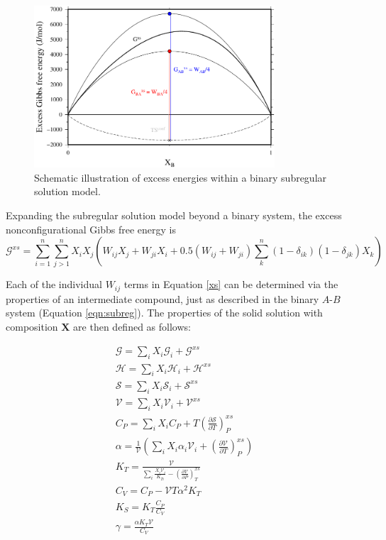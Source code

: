\documentclass[review]{elsarticle}
\begin{document}
\begin{figure}[ht!]
  \centering
  \includegraphics[width=0.8\textwidth]{figures/schematic}
  \caption{Schematic illustration of excess energies within a binary subregular solution model.}
  \label{fig:schematic}
\end{figure}


Expanding the subregular solution model beyond a binary system, the excess nonconfigurational Gibbs free energy is \citep{HW1989} 
\begin{equation}
  \mathcal{G}^{xs} = \sum_{i=1}^n \sum_{j>1}^n X_i X_j \left ( W_{ij} X_j + W_{ji} X_i + 0.5 (W_{ij} + W_{ji}) \sum_k^n (1-\delta_{ik})(1-\delta_{jk}) X_k \right)
  \label{xs}
\end{equation}

Each of the individual $W_{ij}$ terms in Equation \ref{xs} can be determined via the properties of an intermediate compound, just as described in the binary $A$-$B$ system (Equation \ref{eqn:subreg}). The properties of the solid solution with composition $\mathbf{X}$ are then defined as follows:

\begin{eqnarray}
\mathcal{G} = \sum_i X_i \mathcal{G}_i + \mathcal{G}^{xs} \\
\mathcal{H} = \sum_i X_i \mathcal{H}_i + \mathcal{H}^{xs} \\
\mathcal{S} = \sum_i X_i \mathcal{S}_i + \mathcal{S}^{xs} \\
\mathcal{V} = \sum_i X_i \mathcal{V}_i + \mathcal{V}^{xs} \\
C_P = \sum_i X_i C_P  + T \left( \frac{\partial \mathcal{S}}{\partial T} \right)_P^{xs} \\
\alpha = \frac{1}{\mathcal{V}} \left ( \sum_i X_i \alpha_i \mathcal{V}_i + \left( \frac{\partial \mathcal{V}}{\partial T} \right)_P^{xs} \right) \label{alpha} \\
K_T = \frac{\mathcal{V}}{\sum_i \frac{X_i \mathcal{V}_i }{K_{Ti}} - \left( \frac{\partial \mathcal{V}}{\partial P} \right)_T^{xs} } \label{K_T} \\
C_V = C_P - \mathcal{V} T \alpha^2 K_T \\
K_S = K_T \frac{C_P}{C_V} \\
\gamma = \frac{\alpha K_T \mathcal{V}}{C_V}   
\end{eqnarray}
\end{document}
